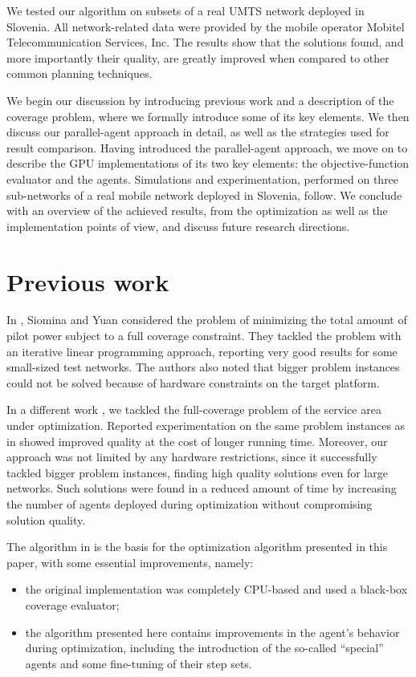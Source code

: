 We tested our algorithm on subsets of a real UMTS network deployed
in Slovenia. All network-related data were provided by the mobile
operator Mobitel Telecommunication Services, Inc. The results show
that the solutions found, and more importantly their quality, are
greatly improved when compared to other common planning techniques.

We begin our discussion by introducing previous work and a description
of the coverage problem, where we formally introduce some of its key
elements. We then discuss our parallel-agent approach in detail, as
well as the strategies used for result comparison. Having introduced
the parallel-agent approach, we move on to describe the GPU implementations
of its two key elements: the objective-function evaluator and the
agents. Simulations and experimentation, performed on three sub-networks
of a real mobile network deployed in Slovenia, follow. We conclude
with an overview of the achieved results, from the optimization as
well as the implementation points of view, and discuss future research
directions.


\section{Previous work}

In \cite{Siomina:Minimum.pilot.power.for.service.coverage}, Siomina
and Yuan considered the problem of minimizing the total amount of
pilot power subject to a full coverage constraint. They tackled the
problem with an iterative linear programming approach, reporting very
good results for some small-sized test networks. The authors also
noted that bigger problem instances could not be solved because of
hardware constraints on the target platform.

In a different work \cite{Benedicic_Pilot.power.optimization:2010},
we tackled the full-coverage problem of the service area under optimization.
Reported experimentation on the same problem instances as in \cite{Siomina:Minimum.pilot.power.for.service.coverage}
showed improved quality at the cost of longer running time. Moreover,
our approach was not limited by any hardware restrictions, since it
successfully tackled bigger problem instances, finding high quality
solutions even for large networks. Such solutions were found in a
reduced amount of time by increasing the number of agents deployed
during optimization without compromising solution quality.

The algorithm in \cite{Benedicic_Pilot.power.optimization:2010} is
the basis for the optimization algorithm presented in this paper,
with some essential improvements, namely:
\begin{itemize}
\item the original implementation was completely CPU-based and used a black-box
coverage evaluator;
\item the algorithm presented here contains improvements in the agent's
behavior during optimization, including the introduction of the so-called
``special'' agents and some fine-tuning of their step sets.
\end{itemize}

